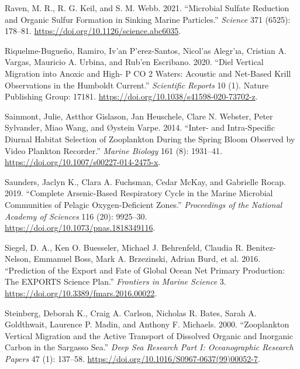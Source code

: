 \documentclass[]{article}
\begin{document}
\leavevmode\hypertarget{ref-ravenMicrobialSulfateReduction2021}{}%
Raven, M. R., R. G. Keil, and S. M. Webb. 2021. ``Microbial Sulfate
Reduction and Organic Sulfur Formation in Sinking Marine Particles.''
\emph{Science} 371 (6525): 178--81.
\url{https://doi.org/10.1126/science.abc6035}.

\leavevmode\hypertarget{ref-riquelme-buguenoDielVerticalMigration2020}{}%
Riquelme-Bugueño, Ramiro, Iv\a'an P\a'erez-Santos, Nicol\a'as
Alegr\a'ıa, Cristian A. Vargas, Mauricio A. Urbina, and Rub\a'en
Escribano. 2020. ``Diel Vertical Migration into Anoxic and High- P CO 2
Waters: Acoustic and Net-Based Krill Observations in the Humboldt
Current.'' \emph{Scientific Reports} 10 (1). Nature Publishing Group:
17181. \url{https://doi.org/10.1038/s41598-020-73702-z}.

\leavevmode\hypertarget{ref-sainmontInterIntraspecificDiurnal2014}{}%
Sainmont, Julie, Astthor Gislason, Jan Heuschele, Clare N. Webster,
Peter Sylvander, Miao Wang, and Øystein Varpe. 2014. ``Inter- and
Intra-Specific Diurnal Habitat Selection of Zooplankton During the
Spring Bloom Observed by Video Plankton Recorder.'' \emph{Marine
Biology} 161 (8): 1931--41.
\url{https://doi.org/10.1007/s00227-014-2475-x}.

\leavevmode\hypertarget{ref-saundersCompleteArsenicbasedRespiratory2019}{}%
Saunders, Jaclyn K., Clara A. Fuchsman, Cedar McKay, and Gabrielle
Rocap. 2019. ``Complete Arsenic-Based Respiratory Cycle in the Marine
Microbial Communities of Pelagic Oxygen-Deficient Zones.''
\emph{Proceedings of the National Academy of Sciences} 116 (20):
9925--30. \url{https://doi.org/10.1073/pnas.1818349116}.

\leavevmode\hypertarget{ref-siegelPredictionExportFate2016}{}%
Siegel, D. A., Ken O. Buesseler, Michael J. Behrenfeld, Claudia R.
Benitez-Nelson, Emmanuel Boss, Mark A. Brzezinski, Adrian Burd, et al.
2016. ``Prediction of the Export and Fate of Global Ocean Net Primary
Production: The EXPORTS Science Plan.'' \emph{Frontiers in Marine
Science} 3. \url{https://doi.org/10.3389/fmars.2016.00022}.

\leavevmode\hypertarget{ref-steinbergZooplanktonVerticalMigration2000}{}%
Steinberg, Deborah K., Craig A. Carlson, Nicholas R. Bates, Sarah A.
Goldthwait, Laurence P. Madin, and Anthony F. Michaels. 2000.
``Zooplankton Vertical Migration and the Active Transport of Dissolved
Organic and Inorganic Carbon in the Sargasso Sea.'' \emph{Deep Sea
Research Part I: Oceanographic Research Papers} 47 (1): 137--58.
\url{https://doi.org/10.1016/S0967-0637(99)00052-7}.
\end{document}
